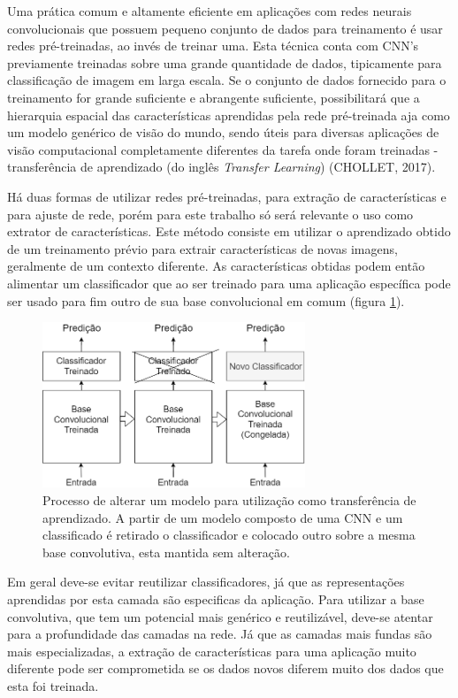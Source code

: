 \documentclass[12pt]{report}
\begin{document}
Uma prática comum e altamente eficiente em aplicações com redes neurais convolucionais que possuem pequeno conjunto de dados para treinamento é usar redes pré-treinadas, ao invés de treinar uma. Esta técnica conta com CNN's  previamente treinadas sobre uma grande quantidade de dados, tipicamente para classificação de imagem em larga escala. Se o conjunto de dados fornecido para o treinamento for grande suficiente e abrangente suficiente, possibilitará que a hierarquia espacial das características aprendidas pela rede pré-treinada aja como um modelo genérico de visão do mundo, sendo úteis para diversas aplicações de visão computacional completamente diferentes da tarefa onde foram treinadas - transferência de aprendizado (do inglês \textit{Transfer Learning}) (CHOLLET, 2017).

Há duas formas de utilizar redes pré-treinadas, para extração de características e para ajuste de rede, porém para este trabalho só será relevante o uso como extrator de características. Este método consiste em utilizar o aprendizado obtido de um treinamento prévio para extrair características de novas imagens, geralmente de um contexto diferente. As características obtidas podem então alimentar um classificador que ao ser treinado para uma aplicação específica pode ser usado para fim outro de sua base convolucional em comum (figura \ref{fig:trasnfer}). 

\begin{figure}
    \centering
    \includegraphics[width=0.7\textwidth]{images/transfer.png}
    \caption{Processo de alterar um modelo para utilização como transferência de aprendizado. A partir de um modelo composto de uma CNN e um classificado é retirado o classificador e colocado outro sobre a mesma base convolutiva, esta mantida sem alteração. }
    \label{fig:trasnfer}
\end{figure}

Em geral deve-se evitar reutilizar classificadores, já que as representações aprendidas por esta camada são especificas da aplicação. Para utilizar a base convolutiva, que tem um potencial mais genérico e reutilizável, deve-se atentar para a profundidade das camadas na rede. Já que as camadas mais fundas são mais especializadas, a extração de características para uma aplicação muito diferente pode ser comprometida se os dados novos diferem muito dos dados que esta foi treinada.
\end{document}
